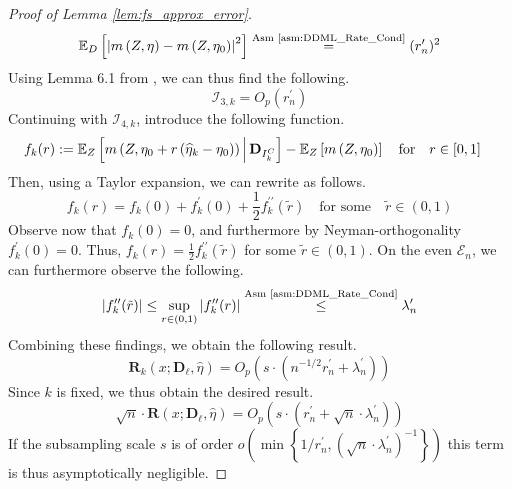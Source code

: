 \begin{proof}[Proof of Lemma \ref{lem:fs_approx_error}]
\begin{equation}
\begin{aligned}
            \mathbb{E}_{D}\left[\left|m\left(Z, \eta\right) - m\left(Z, \eta_{0}\right)\right|^{2}\right]
            \overset{\text{Asm \ref{asm:DDML_Rate_Cond}}}{=} (r_{n}^{\prime})^{2}
        \end{aligned}
    \end{equation}
    Using Lemma 6.1 from \citet{chernozhukov_doubledebiased_2018}, we can thus find the following.
    \begin{equation}
        \mathcal{I}_{3,k} = O_{p}(r_{n}^{\prime})
    \end{equation}
    Continuing with $\mathcal{I}_{4,k}$, introduce the following function.
    \begin{equation}
        \begin{aligned}
            f_{k}(r) 
            & := \mathbb{E}_{Z}\left[m\left(Z, \eta_{0} + r \left(\widehat{\eta}_{k} - \eta_{0}\right)\right) \, \middle| \, \mathbf{D}_{I_{k}^{C}}\right] - \mathbb{E}_{Z}\left[m\left(Z, \eta_{0}\right) \right] 
            \quad \text{for} \quad r \in [0,1]
        \end{aligned}
    \end{equation}
    Then, using a Taylor expansion, we can rewrite as follows.
    \begin{equation}
        f_{k}(r) = f_{k}(0) + f_{k}^{\prime}(0) + \frac{1}{2} f_{k}^{\prime\prime}(\tilde{r})
        \quad \text{for some} \quad \tilde{r} \in (0,1)
    \end{equation}
    Observe now that $f_{k}(0) = 0$, and furthermore by Neyman-orthogonality $f_{k}^{\prime}(0) = 0$.
    Thus, $f_{k}(r) = \frac{1}{2} f_{k}^{\prime\prime}(\tilde{r})$ for some $\tilde{r} \in (0,1)$.
    On the even $\mathcal{E}_{n}$, we can furthermore observe the following.
    \begin{equation}
        \left| f_{k}^{\prime\prime}(\tilde{r}) \right| 
        \leq \sup_{r \in (0,1)} \left| f_{k}^{\prime\prime}(r) \right|
        \overset{\text{Asm \ref{asm:DDML_Rate_Cond}}}{\leq} \lambda_{n}^{\prime}
    \end{equation}
    Combining these findings, we obtain the following result.
    \begin{equation}
         \mathbf{R}_{k}\left(x; \mathbf{D}_{\ell}, \hat{\eta}\right)
         = O_{p}\left(s \cdot \left(n^{-1/2} r_{n}^{\prime} + \lambda_{n}^{\prime}\right)\right)
    \end{equation}
    Since $k$ is fixed, we thus obtain the desired result.
    \begin{equation}
        \sqrt{n} \cdot \mathbf{R}\left(x; \mathbf{D}_{\ell}, \hat{\eta}\right)
         = O_{p}\left(s \cdot \left(r_{n}^{\prime} + \sqrt{n} \cdot \lambda_{n}^{\prime}\right)\right)
    \end{equation}
    If the subsampling scale $s$ is of order $o\left(\min\left\{1/r_{n}^{\prime}, \left(\sqrt{n} \cdot \lambda_{n}^{\prime}\right)^{-1}\right\}\right)$ this term is thus asymptotically negligible.
\end{proof}

